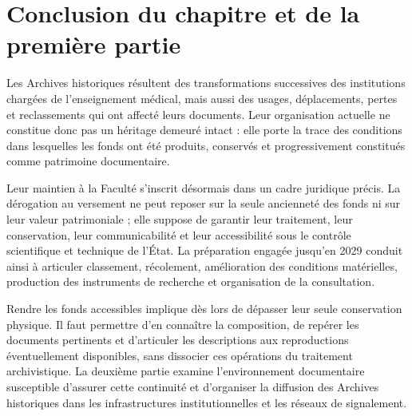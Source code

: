 \section*{Conclusion du chapitre et de la première partie}
\label{sec:conclusion-partie-i}

Les Archives historiques résultent des transformations successives des institutions chargées de l'enseignement médical, mais aussi des usages, déplacements, pertes et reclassements qui ont affecté leurs documents. Leur organisation actuelle ne constitue donc pas un héritage demeuré intact : elle porte la trace des conditions dans lesquelles les fonds ont été produits, conservés et progressivement constitués comme patrimoine documentaire.

Leur maintien à la Faculté s'inscrit désormais dans un cadre juridique précis. La dérogation au versement ne peut reposer sur la seule ancienneté des fonds ni sur leur valeur patrimoniale ; elle suppose de garantir leur traitement, leur conservation, leur communicabilité et leur accessibilité sous le contrôle scientifique et technique de l'État. La préparation engagée jusqu'en 2029 conduit ainsi à articuler classement, récolement, amélioration des conditions matérielles, production des instruments de recherche et organisation de la consultation.

Rendre les fonds accessibles implique dès lors de dépasser leur seule conservation physique. Il faut permettre d'en connaître la composition, de repérer les documents pertinents et d'articuler les descriptions aux reproductions éventuellement disponibles, sans dissocier ces opérations du traitement archivistique. La deuxième partie examine l'environnement documentaire susceptible d'assurer cette continuité et d'organiser la diffusion des Archives historiques dans les infrastructures institutionnelles et les réseaux de \gls{signalement}.